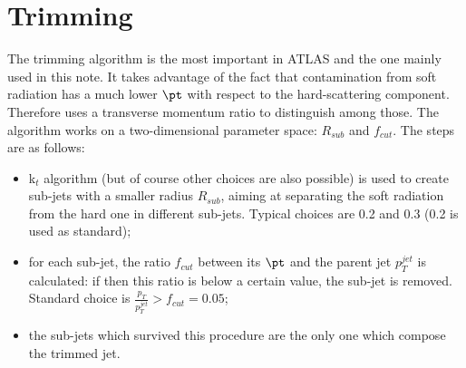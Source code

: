 

\section{Trimming}

The trimming algorithm is the most important in ATLAS and the one mainly used in this note. It takes advantage of the fact that contamination from soft radiation has a much lower $\pt$ with respect to the hard-scattering component. Therefore uses a transverse momentum ratio to distinguish among those. The algorithm works on a two-dimensional parameter space: $R_{sub}$ and $f_{cut}$.
The steps are as follows:
\begin{itemize}
 \item k$_t$ algorithm (but of course other choices are also possible) is used to create sub-jets with a smaller radius $R_{sub}$, aiming at separating the soft radiation from the hard one in different sub-jets. Typical choices are 0.2 and 0.3 (0.2 is used as standard);
 \item for each sub-jet, the ratio $f_{cut}$ between its $\pt$ and the parent jet $p_T^{jet}$ is calculated: if then this ratio is below a certain value, the sub-jet is removed. Standard choice is $\frac{p_{T}}{p_{T}^{jet}} > f_{cut}=0.05$;
 \item the sub-jets which survived this procedure are the only one which compose the trimmed jet.
\end{itemize}

